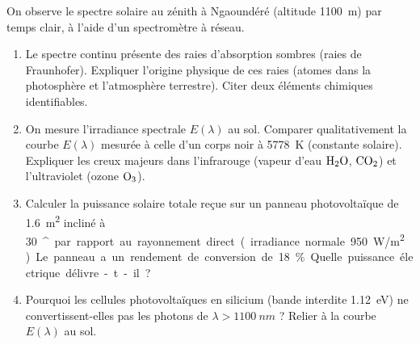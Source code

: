 \documentclass[11pt]{article}
\providecommand{\degree}{^{\circ}}
\begin{document}
\begin{exercice}
On observe le spectre solaire au zénith à Ngaoundéré (altitude \SI{1100}{m}) par temps clair, à l'aide d'un spectromètre à réseau.
\begin{enumerate}
    \item Le spectre continu présente des raies d'absorption sombres (raies de Fraunhofer). Expliquer l'origine physique de ces raies (atomes dans la photosphère et l'atmosphère terrestre). Citer deux éléments chimiques identifiables.
    \item On mesure l'irradiance spectrale $E(\lambda)$ au sol. Comparer qualitativement la courbe $E(\lambda)$ mesurée à celle d'un corps noir à \SI{5778}{K} (constante solaire). Expliquer les creux majeurs dans l'infrarouge (vapeur d'eau $\ce{H2O}$, $\ce{CO2}$) et l'ultraviolet (ozone $\ce{O3}$).
    \item Calculer la puissance solaire totale reçue sur un panneau photovoltaïque de \SI{1,6}{m^2} incliné à \SI{30}{\degree} par rapport au rayonnement direct (irradiance normale \SI{950}{W/m^2}). Le panneau a un rendement de conversion de 18\%. Quelle puissance électrique délivre-t-il ?
    \item Pourquoi les cellules photovoltaïques en silicium (bande interdite \SI{1,12}{eV}) ne convertissent-elles pas les photons de $\lambda > \SI{1100}{nm}$ ? Relier à la courbe $E(\lambda)$ au sol.
\end{enumerate}
\end{exercice}
\end{document}
